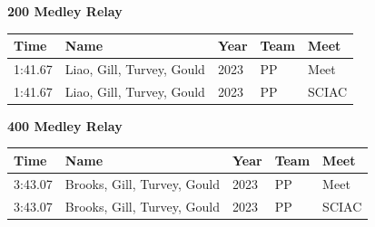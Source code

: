 \vspace{1.2em}
\noindent\begin{minipage}[t]{0.98\textwidth}
\centering
\textbf{\textcolor{teamprimary}{200 Medley Relay}}\par
\vspace{0.5em}
\centering
\small
\renewcommand{\arraystretch}{1.0}
\setlength{\tabcolsep}{4pt}
\begin{tabular}{@{}p{2.7cm}p{4.3cm}p{1.6cm}p{2.7cm}p{2.7cm}@{}}
\toprule
\textbf{Time} & \textbf{Name} & \textbf{Year} & \textbf{Team} & \textbf{Meet} \\
\midrule
1:41.67 & Liao, Gill, Turvey, Gould & 2023 & PP & Meet \\
1:41.67 & Liao, Gill, Turvey, Gould & 2023 & PP & SCIAC \\
\bottomrule
\end{tabular}
\end{minipage}
\vspace{1.2em}
\noindent\begin{minipage}[t]{0.98\textwidth}
\centering
\textbf{\textcolor{teamprimary}{400 Medley Relay}}\par
\vspace{0.5em}
\centering
\small
\renewcommand{\arraystretch}{1.0}
\setlength{\tabcolsep}{4pt}
\begin{tabular}{@{}p{2.7cm}p{4.3cm}p{1.6cm}p{2.7cm}p{2.7cm}@{}}
\toprule
\textbf{Time} & \textbf{Name} & \textbf{Year} & \textbf{Team} & \textbf{Meet} \\
\midrule
3:43.07 & Brooks, Gill, Turvey, Gould & 2023 & PP & Meet \\
3:43.07 & Brooks, Gill, Turvey, Gould & 2023 & PP & SCIAC \\
\bottomrule
\end{tabular}
\end{minipage}